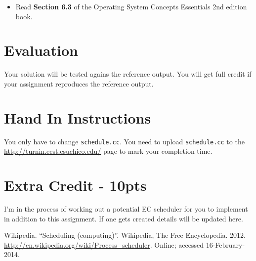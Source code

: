 \documentclass[11pt]{article}
\begin{document}
\begin{itemize}
\item Read {\bf Section 6.3} of the Operating System Concepts Essentials 2nd edition
book. 


\end{itemize}

\section*{Evaluation}

Your solution will be tested agains the reference output. You will get full credit if your assignment reproduces the reference output. 

\section*{Hand In Instructions}

You only have to change {\tt schedule.cc}.  You need to upload
 {\tt schedule.cc} to the \url{http://turnin.ecst.csuchico.edu/} page to mark your completion
time.

\section*{Extra Credit - 10pts}

I'm in the process of working out a potential EC scheduler for you to implement in addition to this assignment. If one gets created details will be updated here. 

\begin{thebibliography}{3}

 Wikipedia.
  \newblock ``Scheduling (computing)''.
  \newblock Wikipedia, The Free Encyclopedia. 2012.
  \newblock
  \url{http://en.wikipedia.org/wiki/Process_scheduler}.
  \newblock Online; accessed 16-February-2014.

\end{thebibliography}
\end{document}
